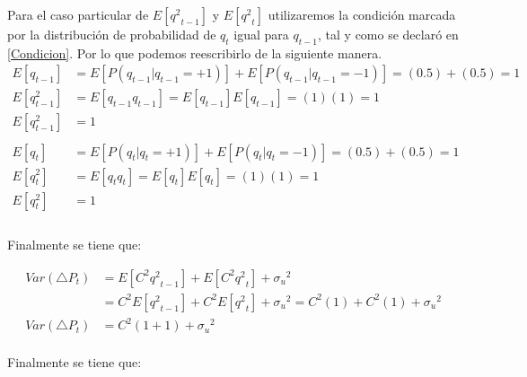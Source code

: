 \documentclass[a4paper]{article}
\begin{document}
Para el caso particular de $E\left[ {{ q }^{2}}_{ t-1 } \right]$ y $E\left[ {{ q }^{2}}_{ t } \right]$ utilizaremos la condici\'on marcada por la distribuci\'on de probabilidad de ${q}_{t}$ igual para ${q}_{t-1}$, tal y como se declar\'o en \eqref{Condicion}. Por lo que podemos reescribirlo de la siguiente manera. \\

\begin{equation}
\begin{aligned}
    E\left[{q}_{t-1} \right] &= E\left[ P({ q }_{ t-1 }|{ q }_{ t-1 }=+1) \right] +                                   E\left[ P({ q }_{ t-1 }|{ q }_{ t-1 }=-1)  \right] = (0.5) + (0.5) = 1 \\
     E\left[ {{q}}^{2}_{t-1} \right] &= E\left[{q}_{t-1}{q}_{t-1} \right] = E\left[{q}_{t-1} \right] E\left[{q}_{t-1} \right] = (1)(1) = 1 \\
     E\left[ {{q}}^{2}_{t-1} \right] &= 1 \\\\
      E\left[{q}_{t} \right] &= E\left[ P({ q }_{ t }|{ q }_{ t }=+1) \right] +                                   E\left[ P({ q }_{ t }|{ q }_{ t }=-1)  \right] = (0.5) + (0.5) = 1 \\
     E\left[ {{q}}^{2}_{t} \right] &= E\left[{q}_{t}{q}_{t} \right] = E\left[{q}_{t} \right] E\left[{q}_{t} \right] = (1)(1) = 1 \\
     E\left[ {{q}}^{2}_{t} \right] &= 1 \\
\end{aligned}
\end{equation}
\\

Finalmente se tiene que:

\begin{equation}
\begin{aligned}
	Var(\triangle{P}_{t}) &= E \left[ {C}^{2}{{q}^{2}}_{t-1} \right] + E \left[ {C}^{2}{{q}^{2}}_{t} \right] + {{\sigma}_{u}}^{2} \\
    &= {C}^{2} E \left[ {{q}^{2}}_{t-1} \right] + {C}^{2} E\left[ {{q}^{2}}_{t} \right] + {{\sigma}_{u}}^{2}
    = {C}^{2}(1) + {C}^{2}(1) + {{\sigma}_{u}}^{2} \\
    Var(\triangle{P}_{t}) &= {C}^{2}(1+1) + {{\sigma}_{u}}^{2} 
\end{aligned}
\end{equation}
\\

Finalmente se tiene que:
\end{document}
